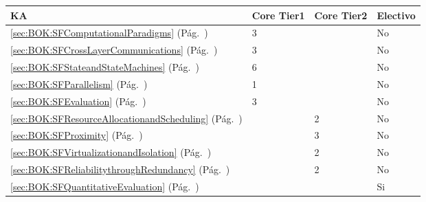 \begin{center}
\begin{tabularx}{\textwidth}{|X|p{1cm}|p{1cm}|p{1.4cm}|}\hline
\textbf{\acf{KA}} & \textbf{Core Tier1} & \textbf{Core Tier2} & \textbf{Electivo} \\ \hline
\ref{sec:BOK:SFComputationalParadigms} \htmlref{\SFComputationalParadigms}{sec:BOK:SFComputationalParadigms}\xspace (Pág.~\pageref{sec:BOK:SFComputationalParadigms}) & 3 & ~ & No \\ \hline
\ref{sec:BOK:SFCrossLayerCommunications} \htmlref{\SFCrossLayerCommunications}{sec:BOK:SFCrossLayerCommunications}\xspace (Pág.~\pageref{sec:BOK:SFCrossLayerCommunications}) & 3 & ~ & No \\ \hline
\ref{sec:BOK:SFStateandStateMachines} \htmlref{\SFStateandStateMachines}{sec:BOK:SFStateandStateMachines}\xspace (Pág.~\pageref{sec:BOK:SFStateandStateMachines}) & 6 & ~ & No \\ \hline
\ref{sec:BOK:SFParallelism} \htmlref{\SFParallelism}{sec:BOK:SFParallelism}\xspace (Pág.~\pageref{sec:BOK:SFParallelism}) & 1 & ~ & No \\ \hline
\ref{sec:BOK:SFEvaluation} \htmlref{\SFEvaluation}{sec:BOK:SFEvaluation}\xspace (Pág.~\pageref{sec:BOK:SFEvaluation}) & 3 & ~ & No \\ \hline
\ref{sec:BOK:SFResourceAllocationandScheduling} \htmlref{\SFResourceAllocationandScheduling}{sec:BOK:SFResourceAllocationandScheduling}\xspace (Pág.~\pageref{sec:BOK:SFResourceAllocationandScheduling}) & ~ & 2 & No \\ \hline
\ref{sec:BOK:SFProximity} \htmlref{\SFProximity}{sec:BOK:SFProximity}\xspace (Pág.~\pageref{sec:BOK:SFProximity}) & ~ & 3 & No \\ \hline
\ref{sec:BOK:SFVirtualizationandIsolation} \htmlref{\SFVirtualizationandIsolation}{sec:BOK:SFVirtualizationandIsolation}\xspace (Pág.~\pageref{sec:BOK:SFVirtualizationandIsolation}) & ~ & 2 & No \\ \hline
\ref{sec:BOK:SFReliabilitythroughRedundancy} \htmlref{\SFReliabilitythroughRedundancy}{sec:BOK:SFReliabilitythroughRedundancy}\xspace (Pág.~\pageref{sec:BOK:SFReliabilitythroughRedundancy}) & ~ & 2 & No \\ \hline
\ref{sec:BOK:SFQuantitativeEvaluation} \htmlref{\SFQuantitativeEvaluation}{sec:BOK:SFQuantitativeEvaluation}\xspace (Pág.~\pageref{sec:BOK:SFQuantitativeEvaluation}) & ~ & ~ & Si \\ \hline
\end{tabularx}
\end{center}
